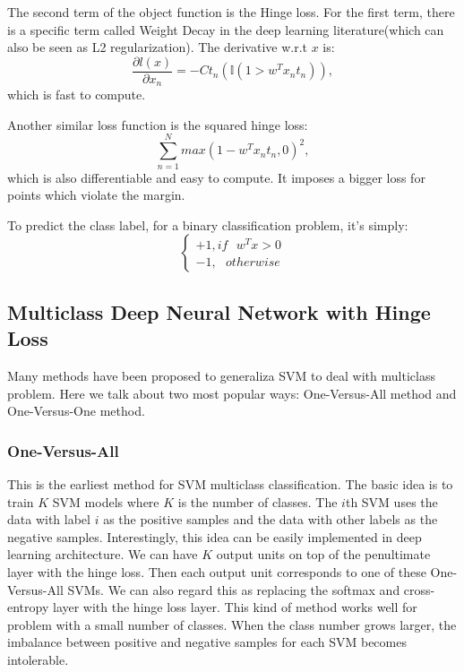 \documentclass{article} %
\begin{document}
The second term of the object function is the Hinge loss. For the first term, there is a specific term called Weight Decay in the deep learning literature(which can also be seen as L2 regularization). The derivative w.r.t $x$ is:
\begin{equation}
\frac{\partial l(x)}{\partial x_{n}} = -Ct_{n}(\mathbb{I}(1>w^{T}x_{n}t_{n})),
\end{equation}
which is fast to compute.


Another similar loss function is the squared hinge loss:
\begin{equation}
\sum_{n=1}^{N}max(1-w^{T}x_{n}t_{n},0)^{2},
\end{equation}
which is also differentiable and easy to compute. It imposes a bigger loss for points which violate the margin.


To predict the class label, for a binary classification problem, it's simply:
\begin{equation}
\left\{\begin{matrix}
+1, if \, \, \, \, w^{T}x > 0\\
-1, \, \, \, \, otherwise 

\end{matrix}\right.
\end{equation}

\subsection{Multiclass Deep Neural Network with Hinge Loss}
Many methods have been proposed to generaliza SVM to deal with multiclass problem. Here we talk about two most popular ways: One-Versus-All method and One-Versus-One method.

\subsubsection{One-Versus-All}
This is the earliest method for SVM multiclass classification. The basic idea is to train $K$ SVM models where $K$ is the number of classes. The $i$th SVM uses the data with label $i$ as the positive samples and the data with other labels as the negative samples. Interestingly, this idea can be easily implemented in deep learning architecture. We can have $K$ output units on top of the penultimate layer with the hinge loss. Then each output unit corresponds to one of
these One-Versus-All SVMs. We can also regard this as replacing the softmax and cross-entropy layer with the hinge loss layer. This kind of method works well for problem with a small number of classes. When the class number grows larger, the imbalance between positive and negative samples for each SVM becomes intolerable.
\end{document}
